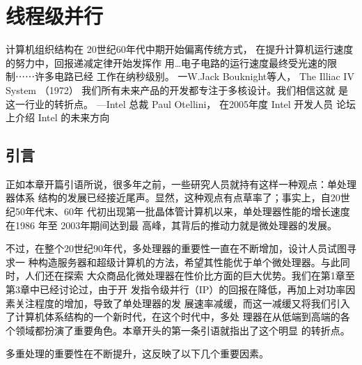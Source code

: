 

\chapter{线程级并行}
计算机组织结构在 20世纪60年代中期开始偏离传统方式，
在提升计算机运行速度的努力中，回报递减定律开始发挥作
用…电子电路的运行速度最终受光速的限制⋯⋯许多电路已经
工作在纳秒级别。
一W.Jack Bouknight等人，
The Illiac IV System （1972）
我们所有未来产品的开发都专注于多核设计。我们相信这就
是这一行业的转折点。
—Intel 总裁 Paul Otellini，
在2005年度 Intel 开发人员
论坛上介绍 Intel 的未来方向

\section{引言}
正如本章开篇引语所说，很多年之前，一些研究人员就持有这样一种观点：单处理器体系
结构的发展已经接近尾声。显然，这种观点有点草率了；事实上，自20世纪50年代末、60年
代初出现第一批晶体管计算机以来，单处理器性能的增长速度在1986 年至 2003年期间达到最
高峰，其背后的推动力就是微处理器的发展。

不过，在整个20世纪90年代，多处理器的重要性一直在不断增加，设计人员试图寻求一
种构造服务器和超级计算机的方法，希望其性能优于单个微处理器。与此同时，人们还在探索
大众商品化微处理器在性价比方面的巨大优势。我们在第1章至第3章中已经讨论过，由于开
发指令级并行（IP）的回报在降低，再加上对功率因素关注程度的增加，导致了单处理器的发
展速率减缓，而这一减缓又将我们引入了计算机体系结构的一个新时代，在这个时代中，多处
理器在从低端到高端的各个领域都扮演了重要角色。本章开头的第一条引语就指出了这个明显
的转折点。

多重处理的重要性在不断提升，这反映了以下几个重要因素。

